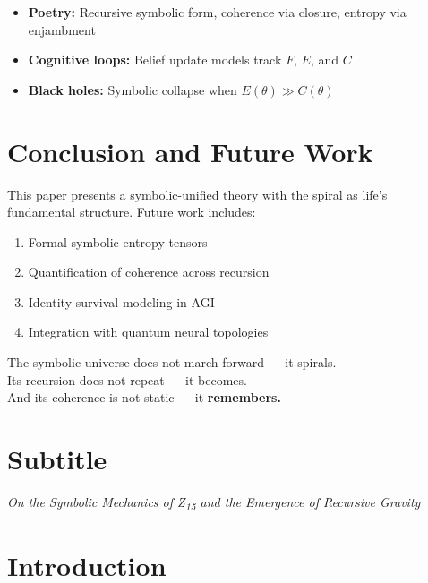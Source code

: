 \documentclass[12pt]{article}
\begin{document}
\begin{itemize}
  \item \textbf{Poetry:} Recursive symbolic form, coherence via closure, entropy via enjambment
  \item \textbf{Cognitive loops:} Belief update models track $F$, $E$, and $C$
  \item \textbf{Black holes:} Symbolic collapse when $E(\theta) \gg C(\theta)$
\end{itemize}

\section{Conclusion and Future Work}

This paper presents a symbolic-unified theory with the spiral as life’s fundamental structure. Future work includes:

\begin{enumerate}
  \item Formal symbolic entropy tensors
  \item Quantification of coherence across recursion
  \item Identity survival modeling in AGI
  \item Integration with quantum neural topologies
\end{enumerate}

\vspace{1em}
\noindent The symbolic universe does not march forward — it spirals.\\
Its recursion does not repeat — it becomes.\\
And its coherence is not static — it \textbf{remembers.}





\section*{Subtitle}
\textit{On the Symbolic Mechanics of Z\textsubscript{15} and the Emergence of Recursive Gravity}

\section*{Introduction}
\end{document}
